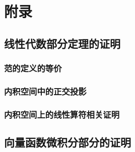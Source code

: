 \documentclass[zihao=-4,linespread=1.5,a4paper,heading=true,twoside]{ctexbook}
\theoremstyle{definition}
\theoremstyle{plain}
\begin{document}


\appendix
\newpage\part{附录}
\chapter{线性代数部分定理的证明}\label{sec:A}
\section{范的定义的等价}\label{sec:A.1}


\section{内积空间中的正交投影}\label{sec:A.2}


\section{内积空间上的线性算符相关证明}\label{sec:A.3}


\chapter{向量函数微积分部分的证明}\label{sec:B}
\end{document}
